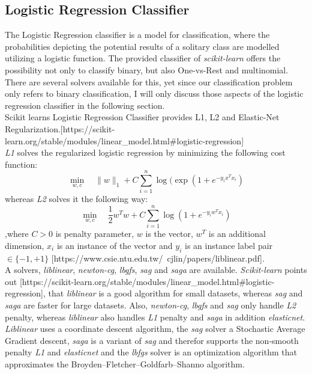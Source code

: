 \documentclass[a4paper, 11pt,titlepage,oneside,openany]{book}
\begin{document}
\subsection{Logistic Regression Classifier}
The Logistic Regression classifier is a model for classification, where the probabilities depicting the potential results of a solitary class are modelled utilizing a logistic function. The provided classifier of \textit{scikit-learn} offers the possibility not only to classify binary, but also One-vs-Rest and multinomial. There are several solvers available for this, yet since our classification problem only refers to binary classification, I will only discuss those aspects of the logistic regression classifier in the following section. \\
\noindent Scikit learns Logistic Regression Classifier provides L1, L2 and Elastic-Net Regularization.[https://scikit-learn.org/stable/modules/linear\_model.html\#logistic-regression]\\
\noindent \textit{L1} solves the regularized logistic regression by minimizing the following cost function:
\[
\min_{w, c} \quad \|w\|_1 + C \sum_{i=1}^n \log(\exp(1+e^{-y_ix^Tx_i})
\]
whereas \textit{L2} solves it the following way:
\[
\min_{w, c} \quad \frac{1}{2}w^T w + C \sum_{i=1}^n \log(1+e^{-y_iw^Tx_i})
\]
,where $C>0$ is penalty parameter, $w$ is the vector, $w^T$ is an additional dimension, $x_i$ is an instance of the vector and $y_i$ is an instance label pair $\in \{-1,+1\}$ [https://www.csie.ntu.edu.tw/~cjlin/papers/liblinear.pdf].\\
\noindent A solvers, \textit{liblinear}, \textit{newton-cg}, \textit{lbgfs}, \textit{sag} and \textit{saga} are available. \textit{Scikit-learn} points out [https://scikit-learn.org/stable/modules/linear\_model.html\#logistic-regression], that \textit{liblinear} is a good algorithm for small datasets, whereas \textit{sag} and \textit{saga} are faster for large datasets. Also, \textit{newton-cg}, \textit{lbgfs} and \textit{sag} only handle \textit{L2} penalty, whereas \textit{liblinear} also handles \textit{L1} penalty and \textit{saga} in addition \textit{elasticnet}. \\
\noindent \textit{Liblinear} uses a coordinate descent algorithm, the \textit{sag} solver a Stochastic Average Gradient descent, \textit{saga} is a variant of \textit{sag} and therefor supports the non-smooth penalty \textit{L1} and \textit{elasticnet} and the \textit{lbfgs} solver is an optimization algorithm that approximates the Broyden–Fletcher–Goldfarb–Shanno algorithm.
\end{document}
